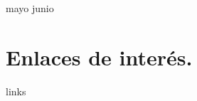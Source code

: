 \documentclass[11pt, oneside]{article}
\begin{document}


\tableofcontents
\clearpage
{mayo}
{junio}


\section{Enlaces de interés.}
    {links}
\end{document}
